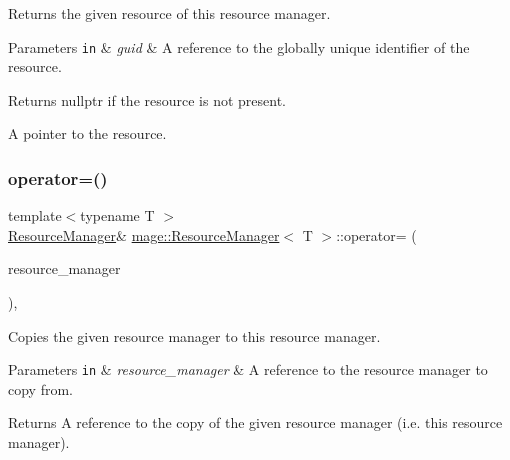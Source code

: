 Returns the given resource of this resource manager.


\begin{DoxyParams}[1]{Parameters}
\mbox{\tt in}  & {\em guid} & A reference to the globally unique identifier of the resource. \\
\hline
\end{DoxyParams}
\begin{DoxyReturn}{Returns}
{\ttfamily nullptr} if the resource is not present. 

A pointer to the resource. 
\end{DoxyReturn}
\hypertarget{classmage_1_1_resource_manager_a5cc1867dbb196671fb53763c98aee1dd}{}\label{classmage_1_1_resource_manager_a5cc1867dbb196671fb53763c98aee1dd} 
\subsubsection{\texorpdfstring{operator=()}{operator=()}}
{\footnotesize\ttfamily template$<$typename T $>$ \\
\hyperlink{classmage_1_1_resource_manager}{Resource\+Manager}\& \hyperlink{classmage_1_1_resource_manager}{mage\+::\+Resource\+Manager}$<$ T $>$\+::operator= (\begin{DoxyParamCaption}\item[{const \hyperlink{classmage_1_1_resource_manager}{Resource\+Manager}$<$ T $>$ \&}]{resource\+\_\+manager }\end{DoxyParamCaption})\hspace{0.3cm}{\ttfamily [private]}, {\ttfamily [delete]}}

Copies the given resource manager to this resource manager.


\begin{DoxyParams}[1]{Parameters}
\mbox{\tt in}  & {\em resource\+\_\+manager} & A reference to the resource manager to copy from. \\
\hline
\end{DoxyParams}
\begin{DoxyReturn}{Returns}
A reference to the copy of the given resource manager (i.\+e. this resource manager). 
\end{DoxyReturn}
\hypertarget{classmage_1_1_resource_manager_a25b8838bb73dfbc2c6589fae7da0099e}{}\label{classmage_1_1_resource_manager_a25b8838bb73dfbc2c6589fae7da0099e} 
